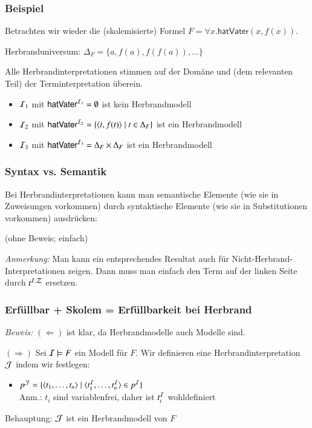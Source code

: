 \documentclass[aspectratio=1610,onlymath]{beamer}
\begin{document}
\begin{frame}\frametitle{Beispiel}

Betrachten wir wieder die (skolemisierte) Formel $F=\forall x.\textsf{hatVater}(x,f(x))$.\bigskip

Herbranduniversum: $\Delta_F=\{a,f(a),f(f(a)),\ldots\}$\medskip

Alle Herbrandinterpretationen stimmen auf der Domäne und (dem relevanten Teil) der Terminterpretation überein.
\begin{itemize}
\item $\mathcal{I}_1$ mit $\textsf{hatVater}^{\mathcal{I}_1}=\emptyset$ ist kein Herbrandmodell
\item $\mathcal{I}_2$ mit $\textsf{hatVater}^{\mathcal{I}_2}=\{\langle{t,f(t)}\rangle\mid t\in\Delta_F\}$ ist ein Herbrandmodell
\item $\mathcal{I}_3$ mit $\textsf{hatVater}^{\mathcal{I}_3}=\Delta_F\times\Delta_F$ ist ein Herbrandmodell
\end{itemize}

\end{frame}

\begin{frame}\frametitle{Syntax vs. Semantik}

Bei Herbrandinterpretationen kann man semantische Elemente (wie sie in Zuweisungen vorkommen) durch syntaktische Elemente (wie sie in Substitutionen vorkommen) ausdrücken:\medskip


(ohne Beweis; einfach)
\bigskip

{\color{devilscss}\footnotesize \emph{Anmerkung:} Man kann ein entsprechendes Resultat auch für Nicht-Herbrand-Interpretationen zeigen. Dann muss man einfach den Term auf der linken Seite durch $t^{\mathcal{I},\mathcal{Z}}$ ersetzen.}

\end{frame}

\begin{frame}\frametitle{Erfüllbar + Skolem = Erfüllbarkeit bei Herbrand}

\pause

\emph{Beweis:} $(\Leftarrow)$ ist klar, da Herbrandmodelle auch Modelle sind.\bigskip\pause

$(\Rightarrow)$ Sei $\mathcal{I}\models F$ ein Modell für $F$. Wir definieren eine Herbrandinterpretation $\mathcal{J}$ indem wir festlegen:
\begin{itemize}
\item $p^{\mathcal{J}}=\{\langle{t_1,\ldots,t_n}\rangle\mid\langle{t_1^{\mathcal{I}},\ldots,t_n^{\mathcal{I}}}\rangle\in p^{\mathcal{I}}\}$\\
{\footnotesize Anm.: $t_i$ sind variablenfrei, daher ist $t_i^{\mathcal{I}}$ wohldefiniert}
\end{itemize}
Behauptung: \alert{$\mathcal{J}$ ist ein Herbrandmodell von $F$}

\end{frame}
\end{document}
